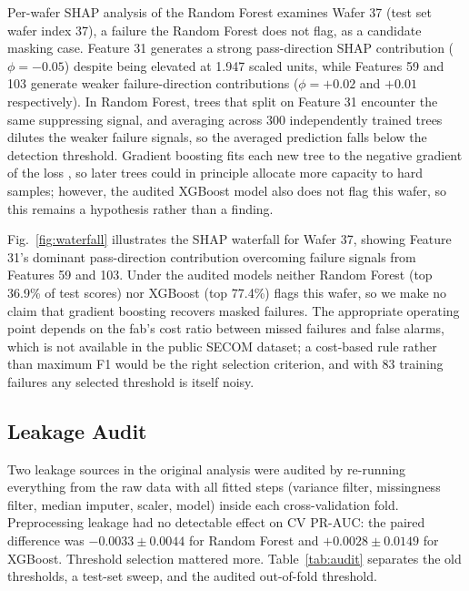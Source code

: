 \documentclass[conference]{IEEEtran}
\begin{document}
Per-wafer SHAP analysis of the Random Forest examines Wafer 37
(test set wafer index 37), a failure the Random Forest does not
flag, as a candidate masking case. Feature 31 generates a strong
pass-direction SHAP contribution ($\phi = -0.05$) despite being
elevated at 1.947 scaled units, while Features 59 and 103 generate
weaker failure-direction contributions ($\phi = +0.02$ and $+0.01$
respectively). In Random Forest, trees that split on Feature 31
encounter the same suppressing signal, and averaging across 300
independently trained trees dilutes the weaker failure signals, so
the averaged prediction falls below the detection threshold.
Gradient boosting fits each new tree to the negative gradient of
the loss \cite{chen2016xgboost}, so later trees could in principle
allocate more capacity to hard samples; however, the audited
XGBoost model also does not flag this wafer, so this remains a
hypothesis rather than a finding.


Fig.~\ref{fig:waterfall} illustrates the SHAP waterfall for
Wafer 37, showing Feature 31's dominant pass-direction contribution
overcoming failure signals from Features 59 and 103. Under the
audited models neither Random Forest (top 36.9\% of test scores)
nor XGBoost (top 77.4\%) flags this wafer, so we make no claim that
gradient boosting recovers masked failures. The appropriate operating
point depends on the fab's cost ratio between missed failures and
false alarms, which is not available in the public SECOM dataset; a
cost-based rule rather than maximum F1 would be the right selection
criterion, and with 83 training failures any selected threshold is
itself noisy.

\subsection{Leakage Audit}
\label{sec:audit}

Two leakage sources in the original analysis were audited by
re-running everything from the raw data with all fitted steps
(variance filter, missingness filter, median imputer, scaler,
model) inside each cross-validation fold. Preprocessing leakage had
no detectable effect on CV PR-AUC: the paired difference was
$-0.0033 \pm 0.0044$ for Random Forest and $+0.0028 \pm 0.0149$
for XGBoost. Threshold selection mattered more.
Table~\ref{tab:audit} separates the old thresholds, a test-set
sweep, and the audited out-of-fold threshold.
\end{document}
